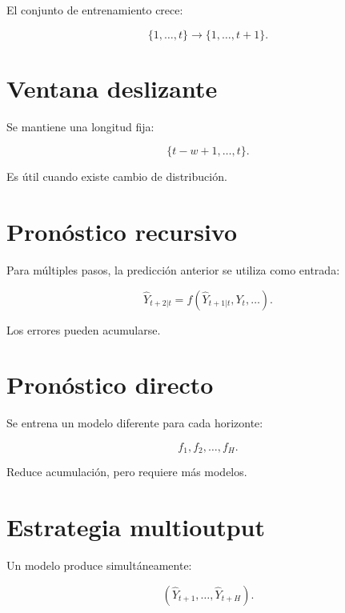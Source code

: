 \documentclass[
  spanish,
  10.5pt,
  letterpaper,
  DIV=11,
  numbers=noendperiod,
  oneside,
  open=any]{scrreprt}
\theoremstyle{definition}
\theoremstyle{definition}
\theoremstyle{plain}
\theoremstyle{remark}
\begin{document}
El conjunto de entrenamiento crece:

\[
\{1,\ldots,t\}
\to
\{1,\ldots,t+1\}.
\]

\section*{Ventana deslizante}\label{ventana-deslizante-1}


Se mantiene una longitud fija:

\[
\{t-w+1,\ldots,t\}.
\]

Es útil cuando existe cambio de distribución.

\section*{Pronóstico recursivo}\label{pronuxf3stico-recursivo}


Para múltiples pasos, la predicción anterior se utiliza como entrada:

\[
\widehat{Y}_{t+2|t}
=
f
\left(
\widehat{Y}_{t+1|t},Y_t,\ldots
\right).
\]

Los errores pueden acumularse.

\section*{Pronóstico directo}\label{pronuxf3stico-directo}


Se entrena un modelo diferente para cada horizonte:

\[
f_1,f_2,\ldots,f_H.
\]

Reduce acumulación, pero requiere más modelos.

\section*{Estrategia multioutput}\label{estrategia-multioutput}


Un modelo produce simultáneamente:

\[
(\widehat{Y}_{t+1},\ldots,\widehat{Y}_{t+H}).
\]
\end{document}
